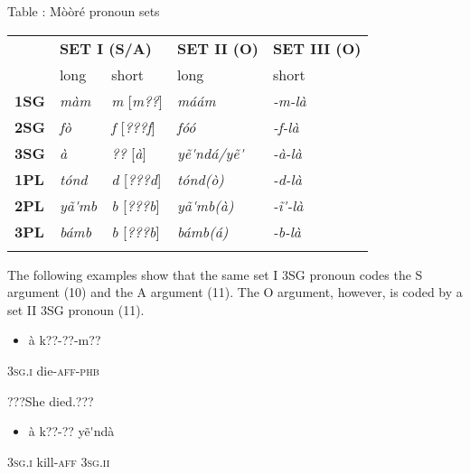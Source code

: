 \documentclass[output=paper]{langsci/langscibook}
\begin{document}
{\begin{styleTabellenberschrift}
\label{bkm:Ref424142670}Table : M\`{o}\`{o}r\'{e} pronoun sets
\end{styleTabellenberschrift}

\begin{tabular}{lllll}
\lsptoprule
\hhline{~----} & \multicolumn{2}{l}{ \textbf{SET I (S/A)}} & \textbf{SET II (O)} & \textbf{SET III (O)}\\
& long & short & long & short\\
\textbf{1SG} & \textit{m\`{a}m} & \textit{m   }[\textit{m??}] & \textit{m\'{a}\'{a}m} & \textit{{}-m-l\`{a}}\\
\textbf{2SG} & \textit{f\`{o}} & \textit{f     }[\textit{???f}] & \textit{f\'{o}\'{o}} & \textit{{}-f-l\`{a}}\\
\textbf{3SG} & \textit{\`{a}} & \textit{??    }[\textit{\`{a}}] & \textit{y\~{e}\'{ }nd\'{a}/y\~{e}\'{ }} & \textit{{}-\`{a}-l\`{a}}\\
\textbf{1PL} & \textit{t\'{o}nd} & \textit{d}    [\textit{???d}] & \textit{t\'{o}nd(\`{o})} & \textit{{}-d-l\`{a}}\\
\textbf{2PL} & \textit{y\~{a}\'{ }mb} & \textit{b    }[\textit{???b}] & \textit{y\~{a}\'{ }mb(\`{a})} & \textit{{}-\~{i}\'{ }-l\`{a}}\\
\textbf{3PL} & \textit{b\'{a}mb} & \textit{b    }[\textit{???b}] & \textit{b\'{a}mb(\'{a})} & \textit{{}-b-l\`{a}}\\
\lspbottomrule
\end{tabular}
The following examples show that the same set I 3SG pronoun codes the S argument (10) and the A argument (11). The O argument, however, is coded by a set II 3SG pronoun (11).

\begin{itemize}
\item \begin{styleNumberedEX}
\label{bkm:Ref424141576}\`{a}    k??-??{}-m??          
\end{styleNumberedEX}\end{itemize}
\begin{styleGloss}
\textsc{3sg.i    }die-\textsc{aff-phb}
\end{styleGloss}

\begin{styleTranslation}
???She died.???
\end{styleTranslation}

\begin{itemize}
\item \begin{styleNumberedEX}
\label{bkm:Ref424141584}\`{a}    k??-??    y\~{e}\'{ }nd\`{a}
\end{styleNumberedEX}\end{itemize}
\begin{styleGloss}
\textsc{3sg.i}    kill-\textsc{aff  3sg.ii}
\end{styleGloss}

}
\end{document}
